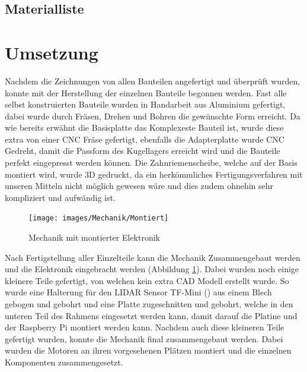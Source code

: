 \subsection{Materialliste}

\section{Umsetzung}
Nachdem die Zeichnungen von allen Bauteilen angefertigt und überprüft wurden, konnte mit der Herstellung der einzelnen Bauteile begonnen werden. Fast alle selbst konstruierten Bauteile wurden in Handarbeit aus Aluminium gefertigt, dabei wurde durch Fräsen, Drehen und Bohren die gewünschte Form erreicht. Da wie bereits erwähnt die Basisplatte das Komplexeste Bauteil ist, wurde diese extra von einer \ac{CNC} Fräse gefertigt, ebenfalls die Adapterplatte wurde \ac{CNC} Gedreht, damit die Passform des Kugellagers erreicht wird und die Bauteile perfekt eingepresst werden können. Die Zahnriemenscheibe, welche auf der Basis montiert wird, wurde \ac{3D} gedruckt, da ein herkömmliches Fertigungsverfahren mit unseren Mitteln nicht möglich gewesen wäre und dies zudem ohnehin sehr kompliziert und aufwändig ist.\\
\begin{figure}[H]
	\centering
	\texttt{[image: images/Mechanik/Montiert]}
	\caption{Mechanik mit montierter Elektronik}
	\label{monitert}
\end{figure}
Nach Fertigstellung aller Einzelteile kann die Mechanik Zusammengebaut werden und die Elektronik eingebracht werden (Abbildung \ref{monitert}). Dabei wurden noch einige kleinere Teile gefertigt, von welchen kein extra \ac{CAD} Modell erstellt wurde. So wurde eine Halterung für den \ac{LIDAR} Sensor TF-Mini () aus einem Blech gebogen und gebohrt und eine Platte zugeschnitten und gebohrt, welche in den unteren Teil des Rahmens eingesetzt werden kann, damit darauf die Platine und der Raspberry Pi montiert werden kann. Nachdem auch diese kleineren Teile gefertigt wurden, konnte die Mechanik final zusammengebaut werden. Dabei wurden die Motoren an ihren vorgesehenen Plätzen montiert und die einzelnen Komponenten zusammengesetzt.
